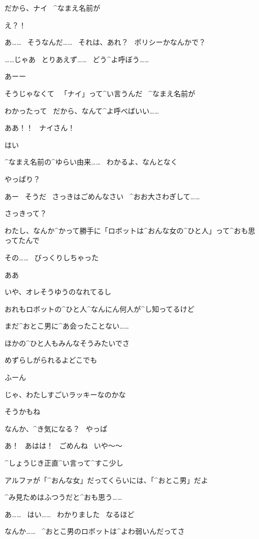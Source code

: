 \Nai だから、ナイ
\ ^{なまえ}{名前}が

\Alpha え？！

\Alpha あ……
\ そうなんだ……
\ それは、あれ？
\ ポリシーかなんかで？

\Alpha ……じゃあ
\ とりあえず……
\ どう^{よ}{呼}ぼう……

\Nai あーー

\page[49]
\Nai そうじゃなくて
\ 「ナイ」って^{い}{言}うんだ
\ ^{なまえ}{名前}が

\Alpha わかったって
\ だから、なんて^{よ}{呼}べばいい……

\Alpha ああ！！
\ ナイさん！

\Nai はい

\Alpha ^{なまえ}{名前}の^{ゆらい}{由来}……
\ わかるよ、なんとなく

\Nai やっぱり？

\page[50]
\Alpha あー
\ そうだ
\ さっきはごめんなさい
\ ^{おお}{大}さわぎして……

\Nai さっきって？

\Alpha わたし、なんか^{かって}{勝手}に「ロボットは^{おんな}{女}の^{ひと}{人}」って^{おも}{思}ってたんで

\Alpha その……
\ びっくりしちゃった

\Nai ああ

\Nai いや、オレそうゆうのなれてるし

\page[51]
\Nai おれもロボットの^{ひと}{人}^{なんにん}{何人}が^{し}{知}ってるけど

\Nai まだ^{おとこ}{男}に^{あ}{会}ったことない……

\Nai ほかの^{ひと}{人}もみんなそうみたいでさ

\Nai めずらしがられるよどこでも

\Alpha ふーん

\Alpha じゃ、わたしすごいラッキーなのかな

\Nai そうかもね

\page[52]
\Nai なんか、^{き}{気}になる？
\ やっぱ

\Alpha あ！
\ あはは！
\ ごめんね
\ いや〜〜

\Alpha ^{しょうじき}{正直}^{い}{言}って^{すこ}{少}し

\Nai アルファが「^{おんな}{女}」だってくらいには、「^{おとこ}{男}」だよ

\Nai ^{み}{見}ためはふつうだと^{おも}{思}う……

\Alpha あ……
\ はい……
\ わかりました
\ なるほど

\page[53]
\Nai なんか……
\ ^{おとこ}{男}のロボットは^{よわ}{弱}いんだってさ

